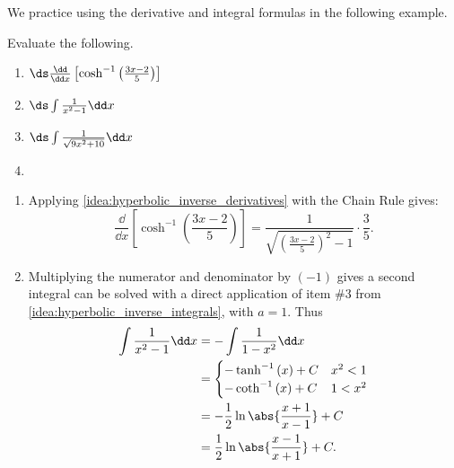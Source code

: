 We practice using the derivative and integral formulas in the following example.

\begin{example}\label{ex_hf3}
Evaluate the following.
\begin{multicols}{2}
\begin{enumerate}
\item	$\ds \frac{\dd}{\dd x}\left[\cosh^{-1}\left(\frac{3x-2}{5}\right)\right]$
\item	$\ds \int\frac{1}{x^2-1}\dd x$
\item	$\ds \int \frac{1}{\sqrt{9x^2+10}}\dd x$
\item[]
\end{enumerate}
\end{multicols}
\solution
\begin{enumerate}
\item	Applying \autoref{idea:hyperbolic_inverse_derivatives} with the Chain Rule gives:
		\[\frac{\dd}{\dd x}\left[\cosh^{-1}\left(\frac{3x-2}5\right)\right] = \frac{1}{\sqrt{\left(\frac{3x-2}5\right)^2-1}}\cdot\frac35.\]

\item		Multiplying the numerator and denominator by $(-1)$ gives 
a %
second integral can be solved with a direct application of item \#3 from \autoref{idea:hyperbolic_inverse_integrals}, with $a=1$. Thus
\begin{align}
\int \frac{1}{x^2-1}\dd x &= -\int \frac{1}{1-x^2}\dd x \notag \\
		&= \begin{cases}-\tanh^{-1}\left(x\right)+C & x^2<1 \\
-\coth^{-1}\left(x\right)+C & 1<x^2 \end{cases} \notag\\
     &=-\frac12\ln\abs{\frac{x+1}{x-1}}+C\notag\\
     &=\frac12\ln\abs{\frac{x-1}{x+1}}+C.\label{eq:hf3}
     \end{align}



\end{enumerate}
\end{example}
